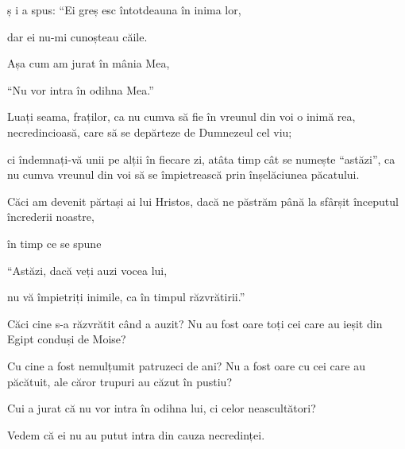 {\par }{\QB ș i a spus: “Ei greș esc întotdeauna în inima lor,

\par }{\QB dar ei nu-mi cunoșteau căile.


\par }{\Q {}Așa cum am jurat în mânia Mea,

\par }{\QB “Nu vor intra în odihna Mea.”


\par }{\PP {}Luați seama, fraților, ca nu cumva să fie în vreunul din voi o inimă rea, necredincioasă, care să se depărteze de Dumnezeul cel viu;

ci îndemnați-vă unii pe alții în fiecare zi, atâta timp cât se numește “astăzi”, ca nu cumva vreunul din voi să se împietrească prin înșelăciunea păcatului.

Căci am devenit părtași ai lui Hristos, dacă ne păstrăm până la sfârșit începutul încrederii noastre,

în timp ce se spune

\par }{\Q “Astăzi, dacă veți auzi vocea lui,

\par }{\QB nu vă împietriți inimile, ca în timpul răzvrătirii.”


\par }{\PP {}Căci cine s-a răzvrătit când a auzit? Nu au fost oare toți cei care au ieșit din Egipt conduși de Moise?

Cu cine a fost nemulțumit patruzeci de ani? Nu a fost oare cu cei care au păcătuit, ale căror trupuri au căzut în pustiu?

Cui a jurat că nu vor intra în odihna lui, ci celor neascultători?

Vedem că ei nu au putut intra din cauza necredinței.



\par }

